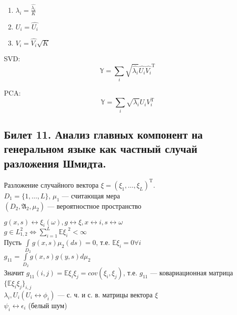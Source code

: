 \begin{enumerate}
\item  $\lambda_i = \frac{\hat{\lambda_i}}{K}$
\item  $U_i = \hat{U_i}$
\item  $V_i = \hat{V_i} \sqrt{K}$
\end{enumerate}

SVD:
\begin{equation*}
\mathbb{Y} = \sum \limits_{i} \sqrt{\hat{\lambda_i}} \hat{U_i} \hat{V_i}^{\mathrm{T}}
\end{equation*}

PCA:
\begin{equation*}
\mathbb{Y} = \sum \limits_{i} \sqrt{\lambda_i} U_i V_i^{\mathrm{T}}
\end{equation*}

\subsection{Билет 11. Анализ главных компонент на генеральном языке как частный случай разложения Шмидта.}

Разложение случайного вектора $\xi = (\xi_1, \dots, \xi_L)^{\mathrm{T}}$.\\

$D_1 = \{1, \dots, L\}$, $\mu_1$ --- считающая мера\\
$(D_2, \mathfrak{A}_2, \mu_2)$ --- вероятностное пространство

$g(x,s) \leftrightarrow \xi_i(\omega), g \leftrightarrow \xi, x \leftrightarrow i, s \leftrightarrow \omega$\\

$g \in L_{1,2}^2 \Leftrightarrow \sum \limits_{i = 1}^L \mathbb{E}{\xi_i}^2 < \infty$\\

Пусть $\int \limits_{D_2} g(x,s) \mu_2(ds) = 0$, т.е. $\mathbb{E}\xi_i = 0 \forall i$\\
$g_{11} = \int \limits_{D_2} g(x,s) g(y,s) d\mu_2$\\

Значит $g_{11}(i,j) = \mathbb{E}\xi_i \xi_j = cov(\xi_i, \xi_j)$, т.е. $g_{11}$ --- ковариационная матрица $\{\mathbb{E}\xi_i \xi_j\}_{i,j}$\\

$\lambda_i, U_i (U_i \leftrightarrow \phi_i)$ --- с. ч. и с. в. матрицы вектора $\xi$\\
$\psi_i \leftrightarrow \epsilon_i$ (белый шум)\\

